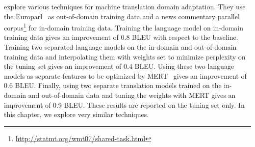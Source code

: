 \citet{koehn-schroeder:2007:WMT} explore various techniques for
machine translation domain adaptation. They use the
Europarl~\citep{koehn:2005:MTSummit} as out-of-domain
training data and a news commentary parallel
corpus\footnote{\url{http://statmt.org/wmt07/shared-task.html}}
for in-domain training data. Training the language model
on in-domain training data gives an improvement of 0.8 BLEU
with respect to the baseline. Training two separated language models
on the in-domain and out-of-domain training data and interpolating
them with weights set to minimize perplexity on the tuning set
gives an improvement of 0.4 BLEU. Using these two language models
as separate features to be optimized by MERT~\citep{och:2003:ACL}
gives an improvement of 0.6 BLEU. Finally, using two separate
translation models trained on the in-domain and out-of-domain
data and tuning the weights with MERT gives an improvement
of 0.9 BLEU. These results are reported on the tuning set only.
In this chapter, we explore very similar techniques.



